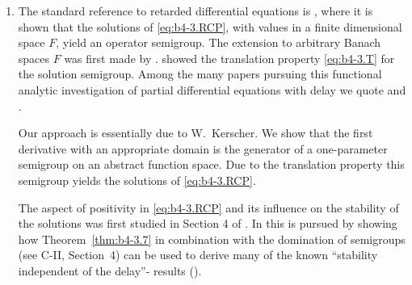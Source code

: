 \begin{enumerate}[label=\emph{Section \arabic*:}, wide, itemsep=1ex]
\item The standard reference to retarded differential equations is \citet{hale:1977}, where it is shown that the solutions of \eqref{eq:b4-3.RCP}, with values in a finite dimensional space $F$, yield an operator semigroup. 
The extension to arbitrary Banach spaces $F$ was first made by \citet{traviswebb:1974}. 
\citet{plant:1977} showed the translation property \eqref{eq:b4-3.T} for the solution semigroup. 
Among the many papers pursuing this functional analytic investigation of partial differential equations with delay we quote \citet{diblasioetal:1984} and \citet{kunischschappacher:1983}.

Our approach is essentially due to W.~Kerscher. 
We show that the first derivative with an appropriate domain is the generator of a one-parameter semigroup on an abstract function space. 
Due to the translation property this semigroup yields the solutions of \eqref{eq:b4-3.RCP}.

The aspect of positivity in \eqref{eq:b4-3.RCP} and its influence on the stability of the solutions was first studied in Section 4 of \citet{kerschernagel:1984}. 
In \citet{kerscher:1986} this is pursued by showing how Theorem~\ref{thm:b4-3.7} in combination with the domination of semigroups (see C-II, Section~4) can be used to derive many of the known \enquote{stability independent of the delay}- results (\eg  \citet{cookeferreira:1983}).
\end{enumerate}




